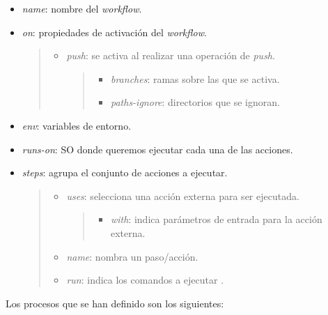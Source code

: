\documentclass[
]{article}
\providecommand{\tightlist}{%
  \setlength{\itemsep}{0pt}\setlength{\parskip}{0pt}}
\begin{document}
\begin{itemize}
\item
  \emph{name}: nombre del \emph{workflow}.
\item
  \emph{on}: propiedades de activación del \emph{workflow}.

  \begin{quote}
  \begin{itemize}
  \item
    \emph{push}: se activa al realizar una operación de \emph{push}.

    \begin{quote}
    \begin{itemize}
    \tightlist
    \item
      \emph{branches}: ramas sobre las que se activa.
    \item
      \emph{paths-ignore}: directorios que se ignoran.
    \end{itemize}
    \end{quote}
  \end{itemize}
  \end{quote}
\item
  \emph{env}: variables de entorno.
\item
  \emph{runs-on}: SO donde queremos ejecutar cada una de las acciones.
\item
  \emph{steps}: agrupa el conjunto de acciones a ejecutar.

  \begin{quote}
  \begin{itemize}
  \item
    \emph{uses}: selecciona una acción externa para ser ejecutada.

    \begin{quote}
    \begin{itemize}
    \tightlist
    \item
      \emph{with}: indica parámetros de entrada para la acción externa.
    \end{itemize}
    \end{quote}
  \item
    \emph{name}: nombra un paso/acción.
  \item
    \emph{run}: indica los comandos a ejecutar .
  \end{itemize}
  \end{quote}
\end{itemize}

Los procesos que se han definido son los siguientes:
\end{document}
